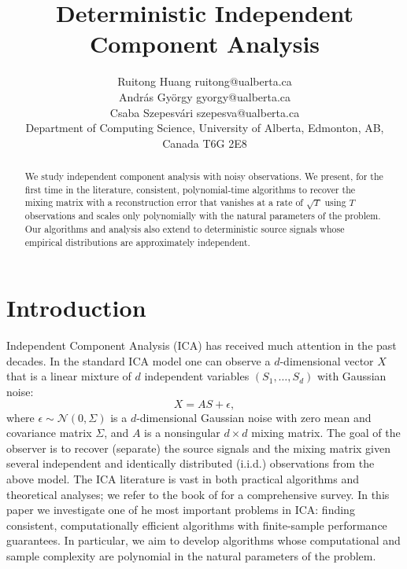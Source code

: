 \documentclass[twoside,11pt]{article}
\title{Deterministic Independent Component Analysis}
\author{\name Ruitong Huang \email ruitong@ualberta.ca \\
\name Andr\'as Gy\"orgy \email gyorgy@ualberta.ca \\
\name Csaba Szepesv\'ari \email szepesva@ualberta.ca \\
\addr Department of Computing Science, University of Alberta,
Edmonton, AB, Canada T6G 2E8 }
\newcommand{\iid}{i.i.d.\xspace}
\begin{document}
 
\maketitle

\begin{abstract}
We study independent component analysis with noisy observations. 
We present, for the first time in the literature, consistent, polynomial-time algorithms to recover 
the mixing matrix with 
a reconstruction error that vanishes at a rate of $\sqrt{T}$ using $T$ observations and scales only polynomially with
the natural parameters of the problem. 
Our algorithms and analysis also extend to deterministic source signals whose empirical distributions are approximately independent.
\end{abstract}

\section{Introduction}
\label{sec:Intro}
Independent Component Analysis (ICA)
has received much attention in the past decades. 
In the standard ICA model one can observe a $d$-dimensional vector $X$ that is a linear mixture of $d$ independent variables $(S_1,\ldots, S_d)$ with Gaussian noise:
\begin{equation}
\label{eq:stoch-ICA}
X = AS+\epsilon,
\end{equation}
where $\epsilon \sim \mathcal{N}(0,\Sigma)$ is a $d$-dimensional Gaussian noise with zero mean and covariance matrix $\Sigma$, and $A$ is a nonsingular $d \times d$ mixing matrix. The goal of the observer is to recover (separate) the source signals and the mixing matrix given several independent and identically distributed (\iid) observations from the above model.
The ICA literature is vast in both practical algorithms and theoretical analyses; 
we refer to the book of \citet{comon2010handbook} for a comprehensive survey.
In this paper we investigate one of he most important problems in ICA: finding consistent, computationally efficient algorithms with finite-sample performance guarantees. In particular, we aim to develop algorithms whose computational and sample complexity are polynomial in the natural parameters of the problem.
\end{document}
